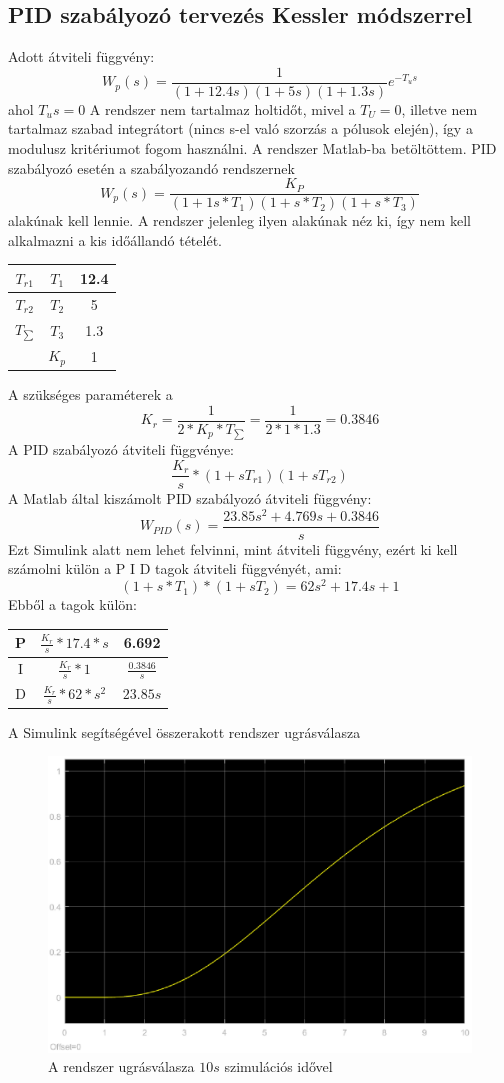 \documentclass[12pt]{article}
\begin{document}
\subsection{PID szabályozó tervezés Kessler módszerrel}
Adott átviteli függvény:
\[W_p(s)=\frac{1}{(1+12.4s)(1+5s)(1+1.3s)}e^{-T_us}\]
ahol $T_us=0$
A rendszer nem tartalmaz holtidőt, mivel a $T_U=0$, illetve nem tartalmaz szabad integrátort (nincs s-el való szorzás a pólusok elején), így a modulusz kritériumot fogom használni. A rendszer Matlab-ba betöltöttem. PID szabályozó esetén a szabályozandó rendszernek \[W_p(s)=\frac{K_P}{(1+1s*T_1)(1+s*T_2)(1+s*T_3)}\] alakúnak kell lennie. A rendszer jelenleg ilyen alakúnak néz ki, így nem kell alkalmazni a kis időállandó tételét.\begin{center}
\begin{tabular}{| c c c |}
\hline $T_{r1}$ & $T_1$ & 12.4 \\
\hline $T_{r2}$ & $T_2$ & 5 \\
\hline $T_{\sum}$ & $T_3$ & 1.3 \\
\hline & $K_p$ & 1 \\
\hline
\end{tabular}
\end{center}
A szükséges paraméterek a \[K_r=\frac{1}{2*K_p*T_\sum}=\frac{1}{2*1*1.3}=0.3846\] 
A PID szabályozó átviteli függvénye: \[\frac{K_r}{s}*(1+sT_{r1})(1+sT_{r2})\]
A Matlab által kiszámolt PID szabályozó átviteli függvény: \[W_{PID}(s)=\frac{23.85s^2+4.769s+0.3846}{s}\]
Ezt Simulink alatt nem lehet felvinni, mint átviteli függvény, ezért ki kell számolni külön a P I D tagok átviteli függvényét, ami:
\[(1+s*T_1)*(1+sT_2)=62s^2+17.4s+1\]
Ebből a tagok külön:
\begin{center}
\begin{tabular}{|c c c|}
\hline P & $\frac{K_r}{s}*17.4*s$ & 6.692 \\
\hline I & $\frac{K_r}{s}*1$ & $\frac{0.3846}{s}$\\
\hline D & $\frac{K_r}{s}*62*s^2$ & $23.85s$\\
\hline
\end{tabular}
\end{center}
A Simulink segítségével összerakott rendszer ugrásválasza
\begin{figure}[H]
\centering
\includegraphics[scale=.70]{KESSLER10S}
\caption{A rendszer ugrásválasza $10s$ szimulációs idővel}
\end{figure}
\end{document}
